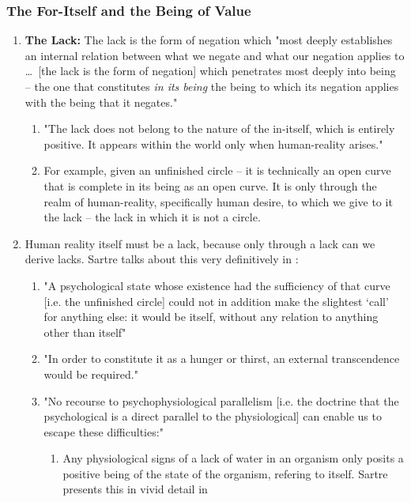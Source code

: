 \subsubsection{The For-Itself and the Being of Value}

\begin{enumerate}
  \item \textbf{The Lack:} The lack is the form of negation which "most deeply establishes an internal relation between what we negate and what our negation applies to \ldots\ [the lack is the form of negation] which penetrates most deeply into being -- the one that constitutes \emph{in its being} the being to which its negation applies with the being that it negates." \autocite[137]{sartre}
  \begin{enumerate}
    \item "The lack does not belong to the nature of the in-itself, which is entirely positive. It appears within the world only when human-reality arises." \autocite[138]{sartre}
    \item For example, given an unfinished circle -- it is technically an open curve that is complete in its being as an open curve. It is only through the realm of human-reality, specifically human desire, to which we give to it the lack -- the lack in which it is not a circle. \autocite[139]{sartre}
  \end{enumerate}
  \item Human reality itself must be a lack, because only through a lack can we derive lacks. Sartre talks about this very definitively in \autocite[139]{sartre}:
  \begin{enumerate}
    \item "A psychological state whose existence had the sufficiency of that curve [i.e. the unfinished circle] could not in addition make the slightest `call' for anything else: it would be itself, without any relation to anything other than itself"
    \item "In order to constitute it as a hunger or thirst, an external transcendence would be required."
    \item "No recourse to psychophysiological parallelism [i.e. the doctrine that the psychological is a direct parallel to the physiological] can enable us to escape these difficulties:" \autocite[139]{sartre}
    \begin{enumerate}
      \item Any physiological signs of a lack of water in an organism only posits a positive being of the state of the organism, refering to itself. Sartre presents this in vivid detail in \autocite[139]{sartre}

\end{enumerate}
\end{enumerate}
\end{enumerate}
